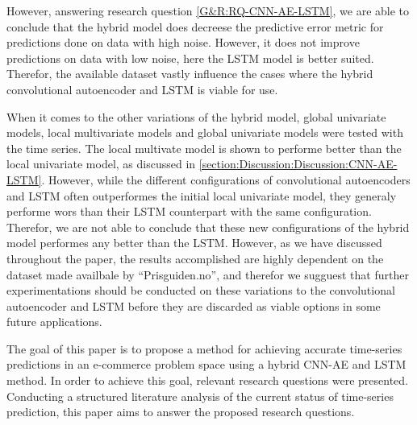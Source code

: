 However, answering research question \cref{G&R:RQ-CNN-AE-LSTM}, we are able to conclude that the hybrid model does
decreese the predictive error metric for predictions done on data with high noise.
However, it does not improve predictions on data with low noise, here the LSTM model is better suited.
Therefor, the available dataset vastly influence the cases where the hybrid convolutional autoencoder and LSTM is viable for use.

When it comes to the other variations of the hybrid model, global univariate models,
local multivariate models and global univariate models were tested with the time series.
The local multivate model is shown to performe better than the local univariate model, as discussed in \cref{section:Discussion:Discussion:CNN-AE-LSTM}.
However, while the different configurations of convolutional autoencoders and LSTM often outperformes the initial local univariate model,
they generaly performe wors than their LSTM counterpart with the same configuration.
Therefor, we are not able to conclude that these new configurations of the hybrid model performes any better than the LSTM.
However, as we have discussed throughout the paper, the results accomplished are highly dependent on the dataset made availbale by ``Prisguiden.no'',
and therefor we sugguest that further experimentations should be conducted on these variations to the convolutional autoencoder and LSTM
before they are discarded as viable options in some future applications.







\iffalse
The goal of this paper is to propose a method for achieving accurate time-series predictions in an e-commerce
problem space using a hybrid CNN-AE and LSTM method.
In order to achieve this goal, relevant research questions were presented.
Conducting a structured literature analysis of the current status of time-series prediction,
this paper aims to answer the proposed research questions.

